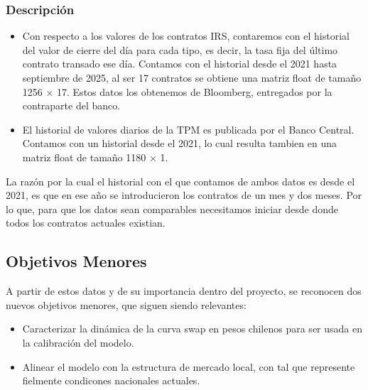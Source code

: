 \subsubsection{Descripción}

\begin{itemize}
    \item Con respecto a los valores de los contratos IRS, contaremos con el historial del valor de cierre del día para cada tipo, es decir, la tasa fija del último contrato transado ese día. Contamos con el historial desde el 2021 hasta septiembre de 2025, al ser 17 contratos se obtiene una matriz float de tamaño 1256 $\times$ 17. Estos datos los obtenemos de Bloomberg, entregados por la contraparte del banco.
    \item El historial de valores diarios de la TPM es publicada por el Banco Central. Contamos con un historial desde el 2021, lo cual resulta tambien en una matriz float de tamaño 1180 $\times$ 1.
\end{itemize}

\qquad La razón por la cual el historial con el que contamos de ambos datos es desde el 2021, es que en ese año se introducieron los contratos de un mes y dos meses. Por lo que, para que los datos sean comparables necesitamos iniciar desde donde todos los contratos actuales existian.

\subsection{Objetivos Menores}

\qquad A partir de estos datos y de su importancia dentro del proyecto, se reconocen dos nuevos objetivos menores, que siguen siendo relevantes:

\begin{itemize}
    \item Caracterizar la dinámica de la curva swap en pesos chilenos para ser usada en la calibración del modelo.
    \item Alinear el modelo con la estructura de mercado local, con tal que represente fielmente condicones nacionales actuales.
\end{itemize}